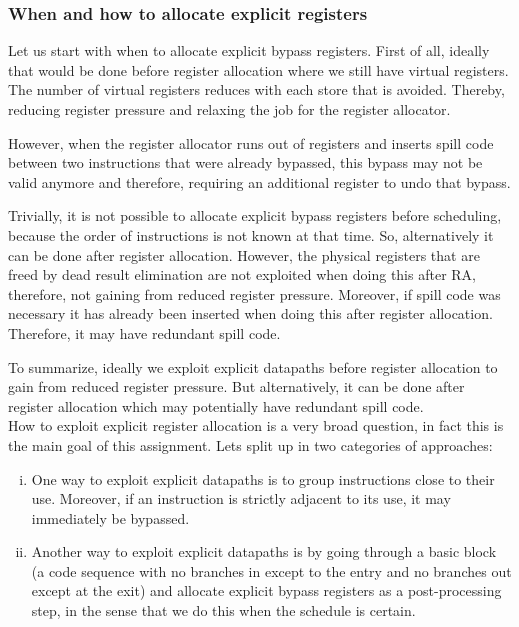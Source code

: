 \subsubsection{When and how to allocate explicit registers}
Let us start with when to allocate explicit bypass registers. First of all, ideally that would be done before register allocation where we still have virtual registers. The number of virtual registers reduces with each store that is avoided. Thereby, reducing register pressure and relaxing the job for the register allocator.

However, when the register allocator runs out of registers and inserts spill code between two instructions that were already bypassed, this bypass may not be valid anymore and therefore, requiring an additional register to undo that bypass.

Trivially, it is not possible to allocate explicit bypass registers before scheduling, because the order of instructions is not known at that time. So, alternatively it can be done after register allocation. However, the physical registers that are freed by dead result elimination are not exploited when doing this after RA, therefore, not gaining from reduced register pressure. Moreover, if spill code was necessary it has already been inserted when doing this after register allocation. Therefore, it may have redundant spill code.

To summarize, ideally we exploit explicit datapaths before register allocation to gain from reduced register pressure. But alternatively, it can be done after register allocation which may potentially have redundant spill code.\\



How to exploit explicit register allocation is a very broad question, in fact this is the main goal of this assignment. Lets split up in two categories of approaches:
\begin{enumerate}[i.]
  \item One way to exploit explicit datapaths is to group instructions close to their use. Moreover, if an instruction is strictly adjacent to its use, it may immediately be bypassed.%
  \item Another way to exploit explicit datapaths is by going through a basic block (a code sequence with no branches in except to the entry and no branches out except at the exit) and allocate explicit bypass registers as a post-processing step, in the sense that we do this when the schedule is certain.
\end{enumerate}


